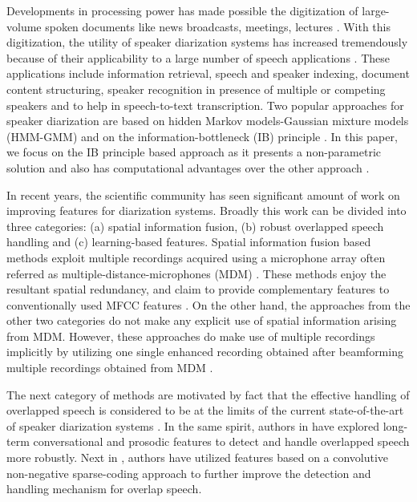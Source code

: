 \documentclass[conference]{IEEEtran}
\begin{document}
Developments in processing power has made possible the digitization of
large-volume spoken documents like news broadcasts, meetings, lectures 
\cite{reviewPaper2,reviewPaper3}. With this digitization, the utility of speaker
diarization systems has increased tremendously because of their applicability to a large 
number of speech applications \cite{reviewPaper1,reviewPaper4}. These applications 
include information retrieval, speech and speaker indexing, 
document content structuring, speaker recognition in presence of multiple or
competing speakers and to help in speech-to-text transcription. Two popular
approaches for speaker diarization are based on hidden Markov models-Gaussian
mixture models (HMM-GMM) \cite{reviewPaper1} and on
the information-bottleneck (IB) principle \cite{aIB2}. In this paper, we focus on the IB principle based approach as it presents a non-parametric solution and also has computational advantages over the
other approach \cite{aIB2}.

In recent years, the scientific community has seen significant amount of work on
improving features for diarization systems. Broadly this work can be divided
into three categories: (a) spatial information fusion, (b) 
robust overlapped speech handling and (c) learning-based features. Spatial
information fusion based methods exploit multiple recordings acquired using a microphone array often 
referred as multiple-distance-microphones (MDM) \cite{aIB3,aIB4,featAngle,speakerUPM,featSpatial,MDM}. 
These methods enjoy the resultant spatial redundancy, and claim to provide complementary features to
conventionally used MFCC features \cite{MDM}. On the other hand, the approaches from the other two categories do not make any explicit use of spatial information arising from MDM. However, these approaches do make use of multiple recordings implicitly by utilizing one single enhanced recording obtained after beamforming multiple recordings obtained from MDM \cite{beamforming}.

The next category of methods are motivated by fact that the effective handling of
overlapped speech is considered to be at the limits of the current 
state-of-the-art of speaker diarization systems \cite{reviewPaper1,featOverLap}. In the same
spirit, authors in \cite{featProsody,featOverLap} have explored long-term
conversational and prosodic features to detect and handle overlapped speech more
robustly. Next in \cite{featSC}, authors have utilized features based on a convolutive non-negative sparse-coding approach to further improve the detection and handling mechanism for overlap speech. 
\end{document}
